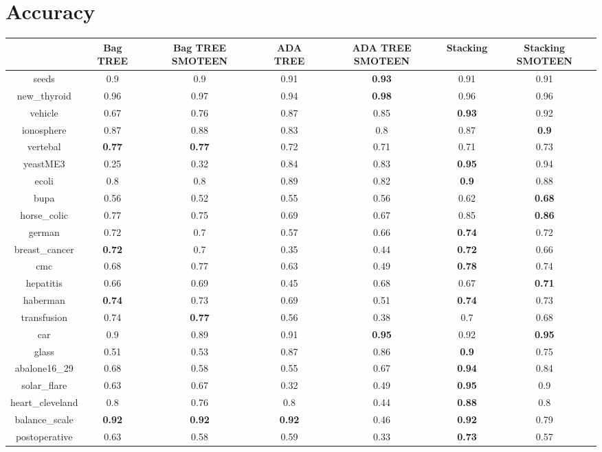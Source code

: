 \documentclass{article}%
\begin{document}
%
\normalsize%
\section*{Accuracy}%
\begin{tabular}{c|cccccc}%
&Bag TREE&Bag TREE SMOTEEN&ADA TREE&ADA TREE SMOTEEN&Stacking&Stacking SMOTEEN\\%
\hline%
seeds&0.9&0.9&0.91&\textbf{0.93}&0.91&0.91\\%
new\_thyroid&0.96&0.97&0.94&\textbf{0.98}&0.96&0.96\\%
vehicle&0.67&0.76&0.87&0.85&\textbf{0.93}&0.92\\%
ionosphere&0.87&0.88&0.83&0.8&0.87&\textbf{0.9}\\%
vertebal&\textbf{0.77}&\textbf{0.77}&0.72&0.71&0.71&0.73\\%
yeastME3&0.25&0.32&0.84&0.83&\textbf{0.95}&0.94\\%
ecoli&0.8&0.8&0.89&0.82&\textbf{0.9}&0.88\\%
bupa&0.56&0.52&0.55&0.56&0.62&\textbf{0.68}\\%
horse\_colic&0.77&0.75&0.69&0.67&0.85&\textbf{0.86}\\%
german&0.72&0.7&0.57&0.66&\textbf{0.74}&0.72\\%
breast\_cancer&\textbf{0.72}&0.7&0.35&0.44&\textbf{0.72}&0.66\\%
cmc&0.68&0.77&0.63&0.49&\textbf{0.78}&0.74\\%
hepatitis&0.66&0.69&0.45&0.68&0.67&\textbf{0.71}\\%
haberman&\textbf{0.74}&0.73&0.69&0.51&\textbf{0.74}&0.73\\%
transfusion&0.74&\textbf{0.77}&0.56&0.38&0.7&0.68\\%
car&0.9&0.89&0.91&\textbf{0.95}&0.92&\textbf{0.95}\\%
glass&0.51&0.53&0.87&0.86&\textbf{0.9}&0.75\\%
abalone16\_29&0.68&0.58&0.55&0.67&\textbf{0.94}&0.84\\%
solar\_flare&0.63&0.67&0.32&0.49&\textbf{0.95}&0.9\\%
heart\_cleveland&0.8&0.76&0.8&0.44&\textbf{0.88}&0.8\\%
balance\_scale&\textbf{0.92}&\textbf{0.92}&\textbf{0.92}&0.46&\textbf{0.92}&0.79\\%
postoperative&0.63&0.58&0.59&0.33&\textbf{0.73}&0.57\\%
\end{tabular}

%
\end{document}
